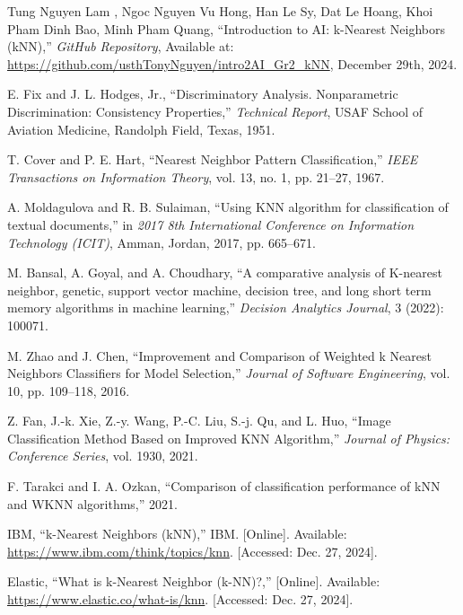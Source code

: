\documentclass[10pt,twocolumn]{article}
\begin{document}
\renewcommand{\refname}{References}
\begin{thebibliography}{99}

Tung Nguyen Lam , Ngoc Nguyen Vu Hong, Han Le Sy, Dat Le Hoang, Khoi Pham Dinh Bao, Minh Pham Quang, ``Introduction to AI: k-Nearest Neighbors (kNN),'' 
\textit{GitHub Repository}, Available at: \url{https://github.com/usthTonyNguyen/intro2AI_Gr2_kNN}, December 29th, 2024.


E. Fix and J. L. Hodges, Jr., ``Discriminatory Analysis. Nonparametric Discrimination: Consistency Properties,'' 
\textit{Technical Report}, USAF School of Aviation Medicine, Randolph Field, Texas, 1951.

T. Cover and P. E. Hart, ``Nearest Neighbor Pattern Classification,'' 
\emph{IEEE Transactions on Information Theory}, vol. 13, no. 1, pp. 21--27, 1967.

A. Moldagulova and R. B. Sulaiman, ``Using KNN algorithm for classification of textual documents,'' 
in \textit{2017 8th International Conference on Information Technology (ICIT)}, Amman, Jordan, 2017, pp. 665--671.

M. Bansal, A. Goyal, and A. Choudhary, ``A comparative analysis of K-nearest neighbor, genetic, support vector machine, decision tree, and long short term memory algorithms in machine learning,'' 
\emph{Decision Analytics Journal}, 3 (2022): 100071.

M. Zhao and J. Chen, ``Improvement and Comparison of Weighted k Nearest Neighbors Classifiers for Model Selection,'' 
\emph{Journal of Software Engineering}, vol. 10, pp. 109--118, 2016.

Z. Fan, J.-k. Xie, Z.-y. Wang, P.-C. Liu, S.-j. Qu, and L. Huo, ``Image Classification Method Based on Improved KNN Algorithm,'' 
\emph{Journal of Physics: Conference Series}, vol. 1930, 2021.

F. Tarakci and I. A. Ozkan, ``Comparison of classification performance of kNN and WKNN algorithms,'' 2021.

IBM, ``k-Nearest Neighbors (kNN),'' IBM. [Online]. Available: \url{https://www.ibm.com/think/topics/knn}. [Accessed: Dec. 27, 2024].

Elastic, ``What is k-Nearest Neighbor (k-NN)?,'' [Online]. Available: \url{https://www.elastic.co/what-is/knn}. [Accessed: Dec. 27, 2024].


\end{thebibliography}
\end{document}
